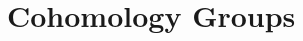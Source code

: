 \documentclass[../Moduli_Spaces_of_Riemann_Surfaces.tex]{subfiles}
\begin{document}
    \section{Cohomology Groups}
    \begin{definition}
        
    \end{definition}
\end{document}
